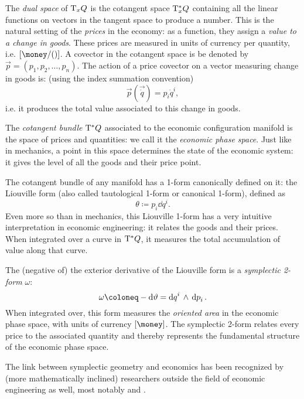The \emph{dual space} of $\mathrm{T}_{x} Q$ is the cotangent space $\mathrm{T}_{x}^*Q$ containing all the linear functions on vectors in the tangent space to produce a number. This is the natural setting of the \emph{prices} in the economy: as a function, they assign a \emph{value to a change in goods}. These prices are measured in units of currency per quantity, i.e. $\qty[\si{\money \per \quantity}]$. A covector in the cotangent space is be denoted by $\vec{p} = (p_1, p_2, \ldots, p_n)$. The action of a price covector on a vector measuring change in goods is: (using the index summation convention)
\begin{equation}
    \vec{p}(\vec{\dot{q}}) = p_i \dot{q}^i,
\end{equation}
i.e. it produces the total value associated to this change in goods.

The \emph{cotangent bundle} $\mathrm{T}^*Q$ associated to the economic configuration manifold is the space of prices and quantities: we call it the \emph{economic phase space}. Just like in mechanics, a point in this space determines the state of the economic system: it gives the level of all the goods and their price point.

The cotangent bundle of any manifold has a 1-form canonically defined on it: the Liouville form (also called tautological 1-form or canonical 1-form), defined as
\begin{equation} 
    \theta \coloneq  p_i \dd{q}^i.
\end{equation}
Even more so than in mechanics, this Liouville 1-form has a very intuitive interpretation in economic engineering: it relates the goods and their prices. When integrated over a curve in $\mathrm{T}^*Q$, it measures the total accumulation of value along that curve.

The (negative of) the exterior derivative of the Liouville form is a \emph{symplectic 2-form} $\omega$:
\begin{equation}
    \omega \coloneq -\dd{\theta} = \wedgep{\dd{q}^i}{\dd{p}_i}.
\end{equation}
When integrated over, this form measures the \emph{oriented area} in the economic phase space, with units of currency $[\si{\money}]$. The symplectic 2-form relates every price to the associated quantity and thereby represents the fundamental structure of the economic phase space.  

The link between symplectic geometry and economics has been recognized by (more mathematically inclined) researchers outside the field of economic engineering as well, most notably \citet{Russell2011} and \citet{Swierstra2014}.

